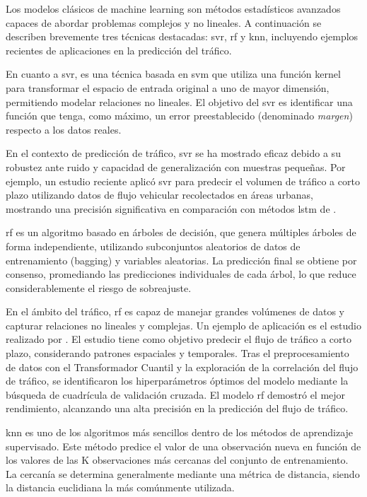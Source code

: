Los modelos clásicos de machine learning son métodos estadísticos avanzados capaces de abordar problemas complejos y no lineales. A continuación se describen brevemente tres técnicas destacadas: \acrlong{svr}, \acrlong{rf} y \acrlong{knn}, incluyendo ejemplos recientes de aplicaciones en la predicción del tráfico.

En cuanto a \acrfull{svr}, es una técnica basada en \acrfull{svm} que utiliza una función kernel para transformar el espacio de entrada original a uno de mayor dimensión, permitiendo modelar relaciones no lineales. El objetivo del \acrshort{svr} es identificar una función que tenga, como máximo, un error preestablecido (denominado \textit{margen}) respecto a los datos reales.

En el contexto de predicción de tráfico, \acrshort{svr} se ha mostrado eficaz debido a su robustez ante ruido y capacidad de generalización con muestras pequeñas. Por ejemplo, un estudio reciente aplicó \acrshort{svr} para predecir el volumen de tráfico a corto plazo utilizando datos de flujo vehicular recolectados en áreas urbanas, mostrando una precisión significativa en comparación con métodos \acrshort{lstm} de \cite{omar2024}.

\acrfull{rf} es un algoritmo basado en árboles de decisión, que genera múltiples árboles de forma independiente, utilizando subconjuntos aleatorios de datos de entrenamiento (bagging) y variables aleatorias. La predicción final se obtiene por consenso, promediando las predicciones individuales de cada árbol, lo que reduce considerablemente el riesgo de sobreajuste.

En el ámbito del tráfico, \acrshort{rf} es capaz de manejar grandes volúmenes de datos y capturar relaciones no lineales y complejas. Un ejemplo de aplicación es el estudio realizado por \cite{forecastRf}. El estudio tiene como objetivo predecir el flujo de tráfico a corto plazo, considerando patrones espaciales y temporales. Tras el preprocesamiento de datos con el Transformador Cuantil y la exploración de la correlación del flujo de tráfico, se identificaron los hiperparámetros óptimos del modelo mediante la búsqueda de cuadrícula de validación cruzada. El modelo \acrshort{rf} demostró el mejor rendimiento, alcanzando una alta precisión en la predicción del flujo de tráfico.

\acrfull{knn} es uno de los algoritmos más sencillos dentro de los métodos de aprendizaje supervisado. Este método predice el valor de una observación nueva en función de los valores de las K observaciones más cercanas del conjunto de entrenamiento. La cercanía se determina generalmente mediante una métrica de distancia, siendo la distancia euclidiana la más comúnmente utilizada.

